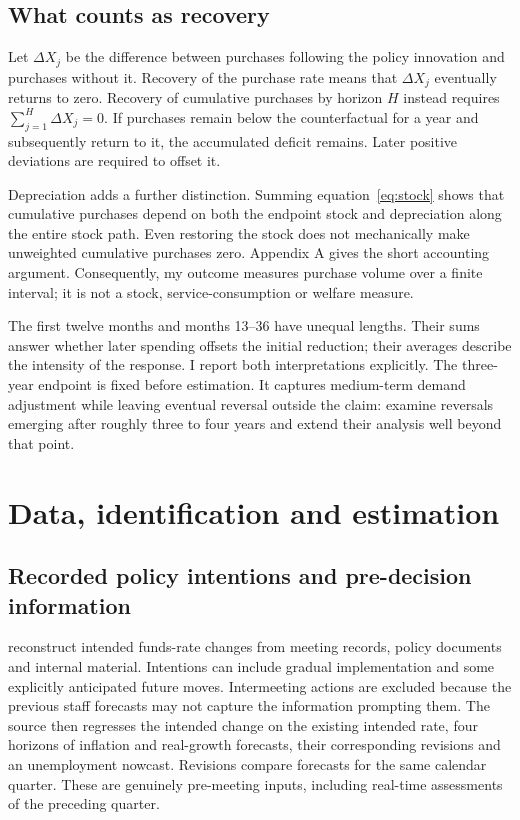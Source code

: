 \documentclass[11pt,a4paper]{article}
\begin{document}
\subsection{What counts as recovery}

Let $\Delta X_j$ be the difference between purchases following the policy innovation and purchases without it. Recovery of the purchase rate means that $\Delta X_j$ eventually returns to zero. Recovery of cumulative purchases by horizon $H$ instead requires $\sum_{j=1}^{H}\Delta X_j=0$. If purchases remain below the counterfactual for a year and subsequently return to it, the accumulated deficit remains. Later positive deviations are required to offset it.

Depreciation adds a further distinction. Summing equation~\eqref{eq:stock} shows that cumulative purchases depend on both the endpoint stock and depreciation along the entire stock path. Even restoring the stock does not mechanically make unweighted cumulative purchases zero. Appendix A gives the short accounting argument. Consequently, my outcome measures purchase volume over a finite interval; it is not a stock, service-consumption or welfare measure.

The first twelve months and months 13--36 have unequal lengths. Their sums answer whether later spending offsets the initial reduction; their averages describe the intensity of the response. I report both interpretations explicitly. The three-year endpoint is fixed before estimation. It captures medium-term demand adjustment while leaving eventual reversal outside the claim: \citet{McKayWieland2021} examine reversals emerging after roughly three to four years and extend their analysis well beyond that point.

\section{Data, identification and estimation}

\subsection{Recorded policy intentions and pre-decision information}

\citet{RomerRomer2004} reconstruct intended funds-rate changes from meeting records, policy documents and internal material. Intentions can include gradual implementation and some explicitly anticipated future moves. Intermeeting actions are excluded because the previous staff forecasts may not capture the information prompting them. The source then regresses the intended change on the existing intended rate, four horizons of inflation and real-growth forecasts, their corresponding revisions and an unemployment nowcast. Revisions compare forecasts for the same calendar quarter. These are genuinely pre-meeting inputs, including real-time assessments of the preceding quarter.
\end{document}
